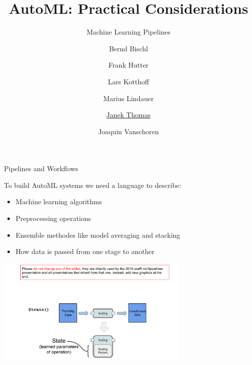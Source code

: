 

\usepackage[normalem]{ulem}
\usepackage{pifont}
\usepackage{relsize}
\renewcommand{\lit}[1]{{\smaller\color{black!60}[#1]}}
\title[AutoML: Practical]{AutoML: Practical Considerations}
\subtitle{Machine Learning Pipelines}
\author[Janek Thomas]{Bernd Bischl \and Frank Hutter \and Lars Kotthoff\newline \and Marius Lindauer \and \underline{Janek Thomas} \and Joaquin Vanschoren}



	
	\maketitle
	
    \begin{frame}{Pipelines and Workflows}
		
		
		
		
		To build AutoML systems we need a language to describe: 

		\begin{itemize}
			\item Machine learning algorithms
			\item Preprocessing operations
			\item Ensemble methodes like model averaging and stacking
			\item How data is passed from one stage to another
		\end{itemize}

		\begin{center}
		\includegraphics[page=7, width=0.7\textwidth, trim=200 0 30 190, clip]{images/mlr3Pipelines_graphics}
		\end{center}

	\end{frame}

